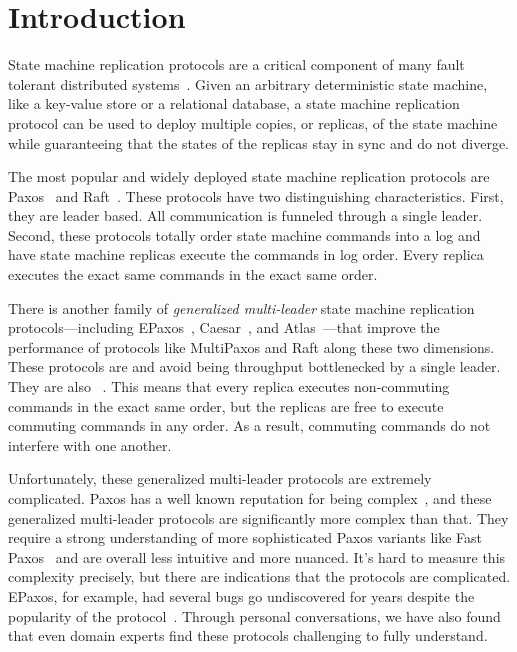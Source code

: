 \section{Introduction}
State machine replication protocols are a critical component of many fault
tolerant distributed systems~\cite{burrows2006chubby, corbett2013spanner,
thomson2012calvin, baker2011megastore, taft2020cockroachdb}. Given an arbitrary
deterministic state machine, like a key-value store or a relational database, a
state machine replication protocol can be used to deploy multiple copies, or
replicas, of the state machine while guaranteeing that the states of the
replicas stay in sync and do not diverge.

The most popular and widely deployed state machine replication protocols are
Paxos~\cite{lamport1998part, burrows2006chubby, corbett2013spanner} and
Raft~\cite{ongaro2014search, taft2020cockroachdb, tidb2019website,
yugabyte2019website}. These protocols have two distinguishing characteristics.
First, they are leader based. All communication is funneled through a single
leader. Second, these protocols totally order state machine commands into a log
and have state machine replicas execute the commands in log order. Every
replica executes the exact same commands in the exact same order.

There is another family of \emph{generalized multi-leader} state machine
replication protocols---including EPaxos~\cite{moraru2013there},
Caesar~\cite{arun2017speeding}, and Atlas~\cite{enes2020state}---that improve
the performance of protocols like MultiPaxos and Raft along these two
dimensions. These protocols are  and avoid being
throughput bottlenecked by a single leader. They are also
~\cite{lamport2005generalized, losa2016brief}. This means
that every replica executes non-commuting commands in the exact same order, but
the replicas are free to execute commuting commands in any order. As a result,
commuting commands do not interfere with one another.

Unfortunately, these generalized multi-leader protocols are extremely
complicated. Paxos has a well known reputation for being
complex~\cite{lamport2001paxos, van2015paxos, ongaro2014search}, and these
generalized multi-leader protocols are significantly more complex than that.
They require a strong understanding of more sophisticated Paxos variants like
Fast Paxos~\cite{lamport2006fast} and are overall less intuitive and more
nuanced. It's hard to measure this complexity precisely, but there are
indications that the protocols are complicated. EPaxos, for example, had several
bugs go undiscovered for years despite the popularity of the
protocol~\cite{sutra2011fast}. Through personal conversations, we have also
found that even domain experts find these protocols challenging to fully
understand.

